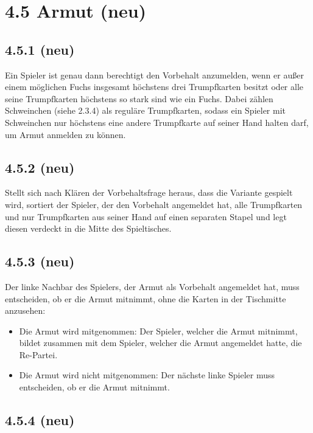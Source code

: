 \section*{4.5 Armut (neu)}

\subsection*{4.5.1 (neu)}
 Ein Spieler ist genau dann berechtigt den Vorbehalt 
anzumelden, wenn er außer einem möglichen Fuchs insgesamt höchstens
drei Trumpfkarten besitzt oder alle seine Trumpfkarten höchstens so
stark sind wie ein Fuchs. Dabei zählen Schweinchen (siehe 2.3.4) als
reguläre Trumpfkarten, sodass ein Spieler mit Schweinchen nur
höchstens eine andere Trumpfkarte auf seiner Hand halten darf, um Armut
anmelden zu können.

\subsection*{4.5.2 (neu)}

Stellt sich nach Klären der Vorbehaltsfrage heraus, dass die Variante
 gespielt wird, sortiert der Spieler, der den Vorbehalt
angemeldet hat, alle Trumpfkarten und nur Trumpfkarten aus seiner Hand
auf einen separaten Stapel und legt diesen verdeckt in die Mitte des
Spieltisches.

\subsection*{4.5.3 (neu)}

Der linke Nachbar des Spielers, der Armut als Vorbehalt angemeldet hat,
muss entscheiden, ob er die Armut mitnimmt, ohne die Karten in der
Tischmitte anzusehen:

\begin{itemize}
    \item Die Armut wird mitgenommen: Der Spieler, welcher die Armut
        mitnimmt, bildet zusammen mit dem Spieler, welcher die Armut
        angemeldet hatte, die Re-Partei.
    \item Die Armut wird nicht mitgenommen: Der nächste linke Spieler
        muss entscheiden, ob er die Armut mitnimmt.
\end{itemize}

\subsection*{4.5.4 (neu)}


